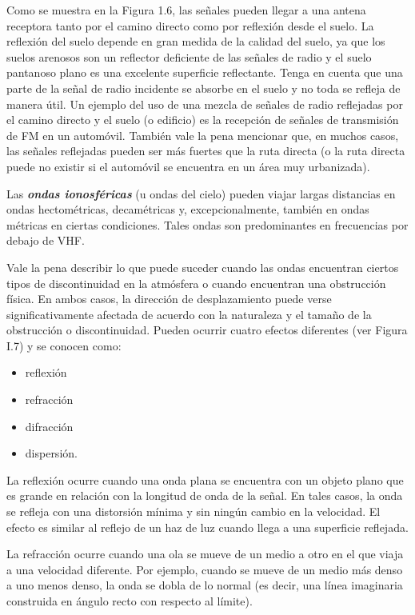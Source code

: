 Como se muestra en la Figura 1.6, las señales pueden llegar a una antena receptora tanto por el camino directo como por reflexión desde el suelo. La reflexión del suelo depende en gran medida de la calidad del suelo, ya que los suelos arenosos son un reflector deficiente de las señales de radio y el suelo pantanoso plano es una excelente superficie reflectante. Tenga en cuenta que una parte de la señal de radio incidente se absorbe en el suelo y no toda se refleja de manera útil. Un ejemplo del uso de una mezcla de señales de radio reflejadas por el camino directo y el suelo (o edificio) es la recepción de señales de transmisión de FM en un automóvil. También vale la pena mencionar que, en muchos casos, las señales reflejadas pueden ser más fuertes que la ruta directa (o la ruta directa puede no existir si el automóvil se encuentra en un área muy urbanizada).

Las \emph{\bf ondas ionosféricas} (u ondas del cielo) pueden viajar largas distancias en ondas hectométricas, decamétricas y, excepcionalmente, también en ondas métricas en ciertas condiciones. Tales ondas son predominantes en frecuencias por debajo de VHF.


Vale la pena describir lo que puede suceder cuando las ondas encuentran ciertos tipos de discontinuidad en la atmósfera o cuando encuentran una obstrucción física. En ambos casos, la dirección de desplazamiento puede verse significativamente afectada de acuerdo con la naturaleza y el tamaño de la obstrucción o discontinuidad. Pueden ocurrir cuatro efectos diferentes (ver Figura I.7) y se conocen como:

\begin{itemize}
     \item reflexión
     \item refracción
     \item difracción
     \item dispersión.
\end{itemize}

La reflexión ocurre cuando una onda plana se encuentra con un objeto plano que es grande en relación con la longitud de onda de la señal. En tales casos, la onda se refleja con una distorsión mínima y sin ningún cambio en la velocidad. El efecto es similar al reflejo de un haz de luz cuando llega a una superficie reflejada.

La refracción ocurre cuando una ola se mueve de un medio a otro en el que viaja a una velocidad diferente. Por ejemplo, cuando se mueve de un medio más denso a uno menos denso, la onda se dobla de lo normal (es decir, una línea imaginaria construida en ángulo recto con respecto al límite).

